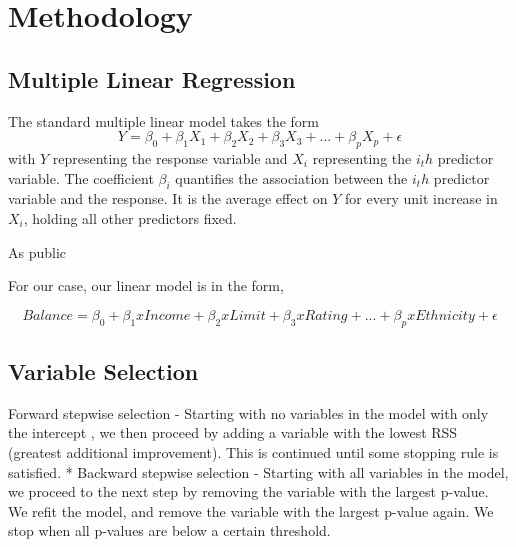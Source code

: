 

\section{Methodology}

\subsection{Multiple Linear Regression}

The standard multiple linear model takes the form $$ Y = \beta_0 + \beta_1X_1 + \beta_2X_2 + \beta_3X_3 + ... + \beta_pX_p + \epsilon $$ with $Y$ representing the response variable and $X_i$ representing the $i_th$ predictor variable. The coefficient $\beta_i$ quantifies the association between the $i_th$ predictor variable and the response. It is the average effect on $Y$ for every unit increase in $X_i$, holding all other predictors fixed.  

As public 

For our case, our linear model is in the form,

$$ Balance = \beta_0 + \beta_1xIncome + \beta_2xLimit + \beta_3xRating + ... + \beta_pxEthnicity + \epsilon $$


\subsection{Variable Selection}
Forward stepwise selection - Starting with no variables in the model with only the intercept , we then proceed by adding a variable with the lowest RSS (greatest additional improvement). This is continued until some stopping rule is satisfied.
* Backward stepwise selection - Starting with all variables in the model, we proceed to the next step by removing the variable with the largest p-value. We refit the model, and remove the variable with the largest p-value again. We stop when all p-values are below a certain threshold.
